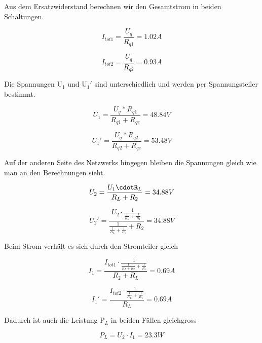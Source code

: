 Aus dem Ersatzwiderstand berechnen wir den Gesamtstrom in beiden Schaltungen. 

\begin{equation}\label{equ:itot1}
    I_{tot1} = \frac{U_{q}}{R_{q1}} =  1.02A 
  \end{equation}
  
\begin{equation}\label{equ:itot2}
    I_{tot2} = \frac{U_{q}}{R_{q2}} =  0.93A 
  \end{equation}		
  
 Die Spannungen U$_1$ und U$_1'$ sind unterschiedlich und werden per Spannungsteiler bestimmt. 

\begin{equation}\label{equ:u1}
    U_{1} = \frac{U_{q}*R_{q1}}{R_{q1}+R_{qe}} =  48.84V
  \end{equation}

\begin{equation}\label{equ:u1'}
    U_{1}' = \frac{U_{q}*R_{q2}}{R_{q2}+R_{qe}} =  53.48V
  \end{equation}


Auf der anderen Seite des Netzwerks hingegen bleiben die Spannungen gleich wie man an den Berechnungen sieht.

\begin{equation}\label{equ:u2}
    U_{2} = \frac{U_{1}\cdotR_{L}}{R_{L}+R_{2}} =  34.88V
  \end{equation}

\begin{equation}\label{equ:u2'}
    U_{2}' = \frac{U_{2}\cdot{{ \frac{1}{\frac{1}{R_L}+\frac{1}{R_1}}}}}{{{ \frac{1}{\frac{1}{R_L}+\frac{1}{R_1}}}}+R_2} =  34.88V
  \end{equation}
  
Beim Strom verhält es sich durch den Stromteiler gleich

  \begin{equation}\label{equ:u1}
    I_{1} = \frac{ I_{tot1}\cdot \frac{1}{\frac{1}{R_L+R_2}+\frac{1}{R_1}}}{R_{2}+R_{L}} =  0.69A
  \end{equation}
  
    \begin{equation}\label{equ:u1}
    I_{1}' = \frac{I_{tot2} \cdot \frac{1}{\frac{1}{R_L}+\frac{1}{R_1}}}{R_{L}} =  0.69A
  \end{equation}
  
  
  Dadurch ist auch die Leistung P$_L$ in beiden Fällen gleichgross
  
      \begin{equation}\label{equ:u1}
   P_{L} = U_{2} \cdot I_{1} =  23.3W
  \end{equation}
  

